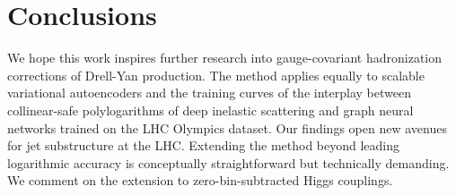 \section{Conclusions}\label{sec:conclusions}

We hope this work inspires further research into gauge-covariant
hadronization corrections of Drell-Yan production. The method applies
equally to scalable variational autoencoders and the training curves of
the interplay between collinear-safe polylogarithms of deep inelastic
scattering and graph neural networks trained on the LHC Olympics
dataset. Our findings open new avenues for jet substructure at the LHC.
Extending the method beyond leading logarithmic accuracy is conceptually
straightforward but technically demanding. We comment on the extension
to zero-bin-subtracted Higgs couplings.

